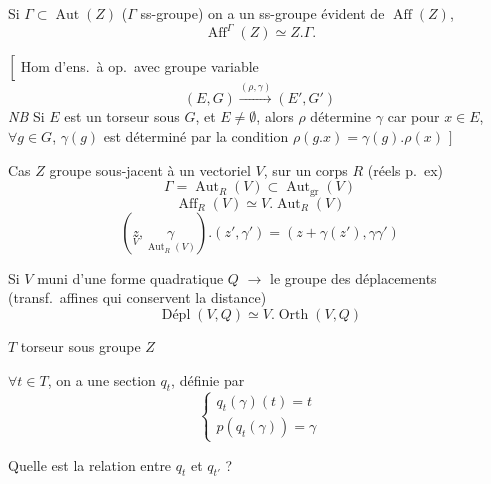 \documentclass[11pt,a4paper]{article}
\begin{document}
Si $\Gamma \subset \operatorname{Aut}(Z)$ ($\Gamma$ ss-groupe) on a un
ss-groupe évident \struck{\ill{}} de $\operatorname{Aff}(Z)$, 
\[
  \operatorname{Aff}^{\Gamma}(Z) \simeq Z.\Gamma .
\]

$\Bigl[$ Hom d'ens.\ à op.\ avec groupe variable
\[
  (E, G) \xrightarrow{(\rho, \gamma)} (E', G')
\]
\emph{NB} Si $E$ est un torseur sous $G$, et $E \neq \emptyset$, alors
$\rho$ détermine $\gamma$ car pour  $x \in E$, $\forall g \in G$,
$\gamma(g)$ est déterminé par la condition
$\rho(g.x) = \gamma(g).\rho(x)$ $\Bigr]$

Cas $Z$ groupe sous-jacent à un vectoriel $V$, sur un corps $R$ (réels p.\ ex)
\[
  \Gamma = \operatorname{Aut}_R(V) \subset \operatorname{Aut}_{\mathrm{gr}}(V)
\]
\[
  \operatorname{Aff}_R(V) \simeq V.\operatorname{Aut}_R(V)
\]
\[
  (\underset{V}{z}, \underset{\operatorname{Aut}_R(V)}{\gamma}) . (z', \gamma')
  = (z + \gamma(z'), \gamma\gamma')
\]

Si $V$ muni d'une forme quadratique  $Q$ $\to$ le
groupe des déplacements (transf.\ affines qui conservent la distance)
\[
  \operatorname{Dépl}(V, Q) \simeq V.\operatorname{Orth}(V, Q)
\]

$T$ torseur  sous groupe $Z$



$\forall t \in T$, on a une section $q_t$, définie par
\[
  \begin{cases}
    q_t(\gamma)(t) = t \\
    p(q_t(\gamma)) = \gamma
  \end{cases}
\]

Quelle est la relation entre $q_t$ et $q_{t'}$ ?
\end{document}

